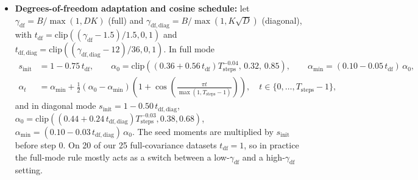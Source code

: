 \documentclass[10pt]{article} %
\newcommand{\clip}{\mathrm{clip}}
\begin{document}
\begin{itemize}[leftmargin=*,nosep]
  and $T_{\mathrm{steps}} = \mathrm{round}(E \cdot S_{\mathrm{ep}})$ EMA steps (fractional epochs use a prefix of the last permutation). The second argument of each $\max$ is a minimum-step boost for tiny $N$ whose gate vanishes smoothly. These continuous gates replace the earlier piecewise brackets ($E = 4 \to 2$ at $N = 10^5$ and $P = 6/5/0$ at $N = 2.5{\times}10^4, 10^5$ in full mode; $E = 3 \to 2$ at $N = 3{\times}10^4$ and $P = 12 \to 0$ at $N = 10^5$ in diagonal mode), which halved $T_{\mathrm{steps}}$ at the $10^5$ boundary. $P$ full-batch polish steps ($\alpha = 1$) follow the EMA phase; in diagonal mode (where in our runs it never triggered), every third polish step compares the mean training log-likelihood computed in its E-step (at the previous step's parameters, in standardized units) with the value three steps earlier and stops if they differ by less than $\mathrm{tol}$. With a user-supplied epoch budget $E$, the polish budget becomes $\min(P, E)$ (full) or $\min(P, 2E)$ (diagonal), and $P=0$ for $E \le 1$.
  \item \textbf{Degrees-of-freedom adaptation and cosine schedule:} let $\gamma_{\mathrm{df}} = B / \max(1, D K)$ (full) and $\gamma_{\mathrm{df,diag}} = B / \max(1, K\sqrt{D})$ (diagonal), with $t_{\mathrm{df}} = \clip((\gamma_{\mathrm{df}} - 1.5)/1.5, 0, 1)$ and $t_{\mathrm{df,diag}} = \clip((\gamma_{\mathrm{df,diag}} - 12)/36, 0, 1)$. In full mode
  \begin{align}
  s_{\mathrm{init}} &= 1 - 0.75\, t_{\mathrm{df}}, \qquad
  \alpha_0 = \clip\!\left((0.36 + 0.56\, t_{\mathrm{df}}) T_{\mathrm{steps}}^{-0.04},\, 0.32,\, 0.85\right), \qquad
  \alpha_{\min} = (0.10 - 0.05\, t_{\mathrm{df}})\,\alpha_0, \label{eq:alpha0}\\
  \alpha_t &= \alpha_{\min} + \tfrac{1}{2}(\alpha_0 - \alpha_{\min})\!\left(1 + \cos\!\left(\frac{\pi t}{\max(1, T_{\mathrm{steps}} - 1)}\right)\right), \quad t \in \{0, \dots, T_{\mathrm{steps}} - 1\}, \label{eq:alphamin}
  \end{align}
  and in diagonal mode $s_{\mathrm{init}} = 1 - 0.50\, t_{\mathrm{df,diag}}$, $\alpha_0 = \clip((0.44 + 0.24\, t_{\mathrm{df,diag}}) T_{\mathrm{steps}}^{-0.03}, 0.38, 0.68)$, $\alpha_{\min} = (0.10 - 0.03\,t_{\mathrm{df,diag}})\,\alpha_0$. The seed moments are multiplied by $s_{\mathrm{init}}$ before step $0$. On 20 of our 25 full-covariance datasets $t_{\mathrm{df}} = 1$, so in practice the full-mode rule mostly acts as a switch between a low-$\gamma_{\mathrm{df}}$ and a high-$\gamma_{\mathrm{df}}$ setting.
\end{itemize}
\end{document}
